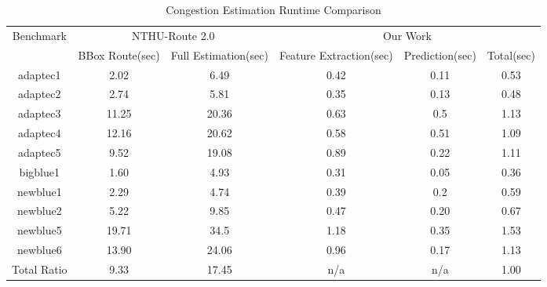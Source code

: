 \begin{table*}[htbp]
    \centering
    \caption{Congestion Estimation Runtime Comparison}
    \label{tab:runtime}
    \begin{tabular}{c|c|c|c|c|c}
        \toprule
        \multirow{2}{*}{Benchmark} & \multicolumn{2}{c|}{NTHU-Route 2.0 \cite{NTHU}} & \multicolumn{3}{c}{Our Work}        \\ \cline{2-6} 
                           & BBox Route(sec)   & Full Estimation(sec)  & Feature Extraction(sec) & Prediction(sec) & Total(sec) \\ \hline
        adaptec1           & 2.02         & 6.49             & 0.42                 & 0.11       & 0.53  \\ \hline
        adaptec2           & 2.74         & 5.81             & 0.35                 & 0.13       & 0.48  \\ \hline
        adaptec3           & 11.25        & 20.36            & 0.63                 & 0.5        & 1.13  \\ \hline
        adaptec4           & 12.16        & 20.62            & 0.58                 & 0.51       & 1.09  \\ \hline
        adaptec5           & 9.52         & 19.08            & 0.89                 & 0.22       & 1.11  \\ \hline
        bigblue1           & 1.60         & 4.93             & 0.31                 & 0.05       & 0.36  \\ \hline
        newblue1           & 2.29         & 4.74             & 0.39                 & 0.2        & 0.59  \\ \hline
        newblue2           & 5.22         & 9.85             & 0.47                 & 0.20       & 0.67  \\ \hline
        newblue5           & 19.71        & 34.5             & 1.18                 & 0.35       & 1.53  \\ \hline
        newblue6           & 13.90        & 24.06            & 0.96                 & 0.17       & 1.13  \\ \hline
        Total Ratio        & 9.33         & 17.45            & n/a                  & n/a        & 1.00 \\ \bottomrule
    \end{tabular}
\end{table*}

